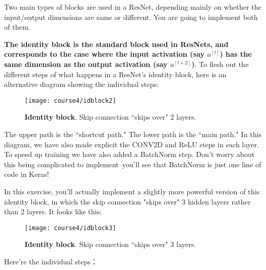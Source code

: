 Two main types of blocks are used in a ResNet, depending mainly on whether the input/output dimensions are same or different. You are going to implement both of them.



\label{identity_block}

{\color{red}\textbf{The identity block is the standard block used in ResNets, and corresponds to the case where the input activation (say $a^{[l]}$) has the same dimension as the output activation (say $a^{[l+2]}$)}}. To flesh out the different steps of what happens in a ResNet's identity block, here is an alternative diagram showing the individual steps:
\begin{figure}[h]
\begin{center}
\texttt{[image: course4/idblock2]}
\caption{{\textbf{Identity block}}. Skip connection ``skips over" 2 layers.}
\end{center}
\end{figure}

The upper path is the ``shortcut path." The lower path is the ``main path." In this diagram, we have also made explicit the CONV2D and ReLU steps in each layer. To speed up training we have also added a BatchNorm step. Don't worry about this being complicated to implement--you'll see that BatchNorm is just one line of code in Keras! 

In this exercise, you'll actually implement a slightly more powerful version of this identity block, in which the skip connection "skips over" 3 hidden layers rather than 2 layers. It looks like this: 
\begin{figure}[h]
\begin{center}
\texttt{[image: course4/idblock3]}
\caption{{\textbf{Identity block}}. Skip connection ``skips over" 3 layers.}
\end{center}
\end{figure}

Here're the individual steps：

